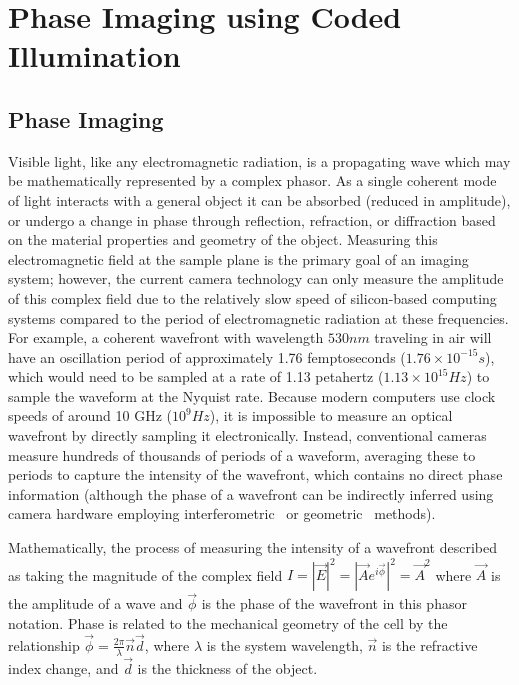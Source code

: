 \chapter{Phase Imaging using Coded Illumination}\label{ch:phase}

\section{Phase Imaging}
Visible light, like any electromagnetic radiation, is a propagating wave which may be mathematically represented by a complex phasor. As a single coherent mode of light interacts with a general object it can be absorbed (reduced in amplitude), or undergo a change in phase through reflection, refraction, or diffraction based on the material properties and geometry of the object. Measuring this electromagnetic field at the sample plane is the primary goal of an imaging system; however, the current camera technology can only measure the amplitude of this complex field due to the relatively slow speed of silicon-based computing systems compared to the period of electromagnetic radiation at these frequencies. For example, a coherent wavefront with wavelength $530nm$ traveling in air will have an oscillation period of approximately 1.76 femptoseconds ($1.76 \times 10^{-15} s$), which would need to be sampled at a rate of 1.13 petahertz ($1.13 \times 10^{15} Hz$) to sample the waveform at the Nyquist rate. Because modern computers use clock speeds of around 10 GHz ($10^9 Hz$), it is impossible to measure an optical wavefront by directly sampling it electronically. Instead, conventional cameras measure hundreds of thousands of periods of a waveform, averaging these to periods to capture the intensity of the wavefront, which contains no direct phase information (although the phase of a wavefront can be indirectly inferred using camera hardware employing interferometric~\cite{phasics, platt2001history} or geometric~\cite{Ng2005} methods).

Mathematically, the process of measuring the intensity of a wavefront described as taking the magnitude of the complex field $I =|\vec{E}|^2 =|\vec{A}e^{i\vec{\phi}}|^2 = \vec{A}^2$ where $\vec{A}$ is the amplitude of a wave and $\vec{\phi}$ is the phase of the wavefront in this phasor notation. Phase is related to the mechanical geometry of the cell by the relationship $\vec{\phi} = \frac{2\pi}{\lambda} \vec{n} \vec{d}$, where $\lambda$ is the system wavelength, $\vec{n}$ is the refractive index change, and $\vec{d}$ is the thickness of the object.

